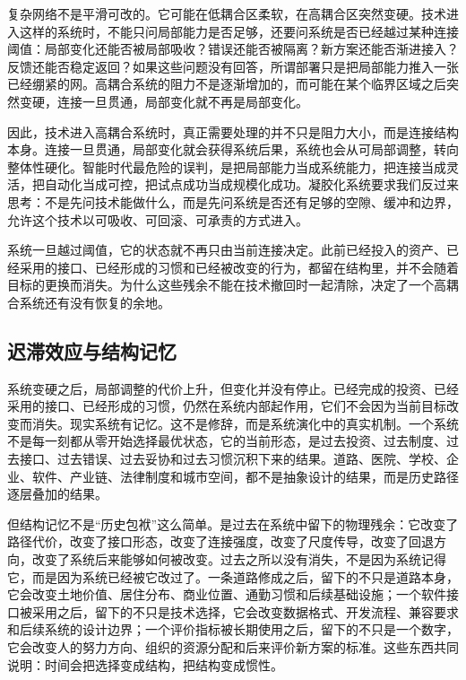 复杂网络不是平滑可改的。它可能在低耦合区柔软，在高耦合区突然变硬。技术进入这样的系统时，不能只问局部能力是否足够，还要问系统是否已经越过某种连接阈值：局部变化还能否被局部吸收？错误还能否被隔离？新方案还能否渐进接入？反馈还能否稳定返回？如果这些问题没有回答，所谓部署只是把局部能力推入一张已经绷紧的网。高耦合系统的阻力不是逐渐增加的，而可能在某个临界区域之后突然变硬，连接一旦贯通，局部变化就不再是局部变化。

因此，技术进入高耦合系统时，真正需要处理的并不只是阻力大小，而是连接结构本身。连接一旦贯通，局部变化就会获得系统后果，系统也会从可局部调整，转向整体性硬化。智能时代最危险的误判，是把局部能力当成系统能力，把连接当成灵活，把自动化当成可控，把试点成功当成规模化成功。凝胶化系统要求我们反过来思考：不是先问技术能做什么，而是先问系统是否还有足够的空隙、缓冲和边界，允许这个技术以可吸收、可回滚、可承责的方式进入。

系统一旦越过阈值，它的状态就不再只由当前连接决定。此前已经投入的资产、已经采用的接口、已经形成的习惯和已经被改变的行为，都留在结构里，并不会随着目标的更换而消失。为什么这些残余不能在技术撤回时一起清除，决定了一个高耦合系统还有没有恢复的余地。

\subsection{迟滞效应与结构记忆}

系统变硬之后，局部调整的代价上升，但变化并没有停止。已经完成的投资、已经采用的接口、已经形成的习惯，仍然在系统内部起作用，它们不会因为当前目标改变而消失。现实系统有记忆。这不是修辞，而是系统演化中的真实机制。一个系统不是每一刻都从零开始选择最优状态，它的当前形态，是过去投资、过去制度、过去接口、过去错误、过去妥协和过去习惯沉积下来的结果。道路、医院、学校、企业、软件、产业链、法律制度和城市空间，都不是抽象设计的结果，而是历史路径逐层叠加的结果。


但结构记忆不是“历史包袱”这么简单。是过去在系统中留下的物理残余：它改变了路径代价，改变了接口形态，改变了连接强度，改变了尺度传导，改变了回退方向，改变了系统后来能够如何被改变。过去之所以没有消失，不是因为系统记得它，而是因为系统已经被它改过了。一条道路修成之后，留下的不只是道路本身，它会改变土地价值、居住分布、商业位置、通勤习惯和后续基础设施；一个软件接口被采用之后，留下的不只是技术选择，它会改变数据格式、开发流程、兼容要求和后续系统的设计边界；一个评价指标被长期使用之后，留下的不只是一个数字，它会改变人的努力方向、组织的资源分配和后来评价新方案的标准。这些东西共同说明：时间会把选择变成结构，把结构变成惯性。

